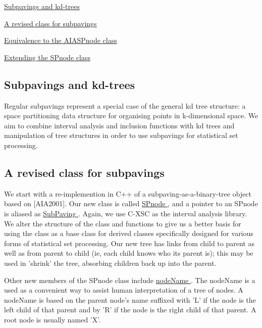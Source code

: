 
\begin{DoxyItemize}
\item \hyperlink{newsubpavings_newsec_subpavingsKd}{\-Subpavings and kd-\/trees}
\item \hyperlink{newsubpavings_newsec_reimplementation}{\-A revised class for subpavings}
\item \hyperlink{newsubpavings_newsec_equivalence}{\-Equivalence to the \-A\-I\-A\-S\-Pnode class}
\item \hyperlink{newsubpavings_newsec_extension}{\-Extending the \-S\-Pnode class}
\end{DoxyItemize}



\hypertarget{newsubpavings_newsec_subpavingsKd}{}\subsection{\-Subpavings and kd-\/trees}\label{newsubpavings_newsec_subpavingsKd}
\-Regular subpavings represent a special case of the general kd tree structure\-: a space partitioning data structure for organising points in k-\/dimensional space. \-We aim to combine interval analysis and inclusion functions with kd trees and manipulation of tree structures in order to use subpavings for statistical set processing.



\hypertarget{newsubpavings_newsec_reimplementation}{}\subsection{\-A revised class for subpavings}\label{newsubpavings_newsec_reimplementation}
\-We start with a re-\/implemention in \-C++ of a subpaving-\/as-\/a-\/binary-\/tree object based on \mbox{[}\-A\-I\-A2001\mbox{]}. \-Our new class is called \hyperlink{classsubpavings_1_1SPnode}{\-S\-Pnode }, and a pointer to an \-S\-Pnode is aliased as \hyperlink{namespacesubpavings_a7e50e3fe54ef41646fbb6155160805cc}{\-Sub\-Paving }. \-Again, we use \-C-\/\-X\-S\-C as the interval analysis library. \-We alter the structure of the class and functions to give us a better basis for using the class as a base class for derived classes specifically designed for various forms of statistical set processing. \-Our new tree has links from child to parent as well as from parent to child (ie, each child knows who its parent is); this may be used in 'shrink' the tree, absorbing children back up into the parent.

\-Other new members of the \-S\-Pnode class include \hyperlink{classsubpavings_1_1SPnode_a90803dc066d955d4aec89c00879ff610}{node\-Name }. \-The node\-Name is a used as a convenient way to assist human interpretation of a tree of nodes. \-A \label{newsubpavings_SPnodename}%
\hypertarget{newsubpavings_SPnodename}{}%
node\-Name is based on the parent node's name suffixed with '\-L' if the node is the left child of that parent and by '\-R' if the node is the right child of that parent. \-A root node is usually named '\-X'.

